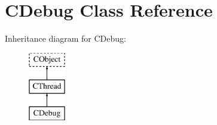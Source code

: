 \hypertarget{class_c_debug}{\section{C\-Debug Class Reference}
\label{class_c_debug}
}
Inheritance diagram for C\-Debug\-:\begin{figure}[H]
\begin{center}
\leavevmode
\includegraphics[height=3.000000cm]{class_c_debug}
\end{center}
\end{figure}
